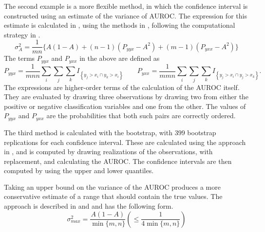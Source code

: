 The second example is a more flexible method, in which the confidence interval is constructed using an estimate of the variance of AUROC.
The expression for this estimate is calculated in \citet{hanleymcneil1982}, using the methods in \citet{proc2011}, following the computational strategy in \citet{sunxu2014}.
%
\begin{equation}
    \sigma^2_A = \frac{1}{mn} \{ A(1 - A) + (n - 1)(P_{yyx} - A^2) + (m - 1)(P_{yxx} - A^2) \}
\end{equation}
%
The terms $P_{yyx}$ and $P_{yxx}$ in the above are defined as
%
\begin{equation}
    P_{yyx} = \frac{1}{mnn} \sum_i \sum_j \sum_k I_{\left\{ y_j > x_i \cap y_k > x_i \right\}}
    \qquad
    P_{yxx} = \frac{1}{mmn} \sum_i \sum_j \sum_k I_{\left\{ y_j > x_i \cap y_j > x_k \right\}}.
\end{equation}
%
The expressions are higher-order terms of the calculation of the AUROC itself.
They are evaluated by drawing three observations by drawing two from either the positive or negative classification variables and one from the other.
The values of $P_{yyx}$ and $P_{yxx}$ are the probabilities that both such pairs are correctly ordered.

The third method is calculated with the bootstrap, with $399$ bootstrap replications for each confidence interval.
These are calculated using the approach in \citet{proc2011}, and is computed by drawing realizations of the observations, with replacement, and calculating the AUROC.
The confidence intervals are then computed by using the upper and lower quantiles.

Taking an upper bound on the variance of the AUROC produces a more conservative estimate of a range that should contain the true values.
The approach is described in \citet{birn1957} and \citet{vandan1915} and has the following form.
%
\begin{equation}
    \sigma^2_{max} = \frac{A(1-A)}{\min\{ m, n \}}
    \left( \leq \frac{1}{4 \min\{ m, n \} } \right)
\end{equation}
%






